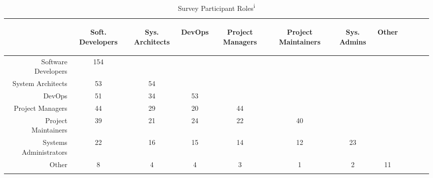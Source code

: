 \begin{table}[!htbp]
\renewcommand{\arraystretch}{1.3}
\caption{Survey Participant Roles\textsuperscript{i}}
\label{survey_roles}
\centering
\begin{tabularx}{\textwidth}{@{}r|*{10}{C}c@{}}
\toprule
\addlinespace[5.4em]
	& \begin{rotate}{45} Soft. Developers \end{rotate} 
	& \begin{rotate}{45} Sys. Architects \end{rotate} 
	& \begin{rotate}{45} DevOps \end{rotate} 
	& \begin{rotate}{45} Project Managers \end{rotate}
	& \begin{rotate}{45} Project Maintainers \end{rotate}
	& \begin{rotate}{45} Sys. Admins \end{rotate}
	& \begin{rotate}{45} Other \end{rotate}\\
\midrule
	Software Developers & 154 & & & & & & \\
	System Architects & 53 & 54 & & & & & \\
	DevOps & 51 & 34 & 53 & & & & \\
	Project Managers & 44 & 29 & 20 & 44 & & & \\
	Project Maintainers & 39 & 21 & 24 & 22 & 40 & & \\
	Systems Administrators & 22 & 16 & 15 & 14 & 12 & 23 & \\
	Other & 8 & 4 & 4 & 3 & 1 & 2 & 11 \\
\bottomrule
\end{tabularx}
\vspace*{-\baselineskip}
\end{table}

